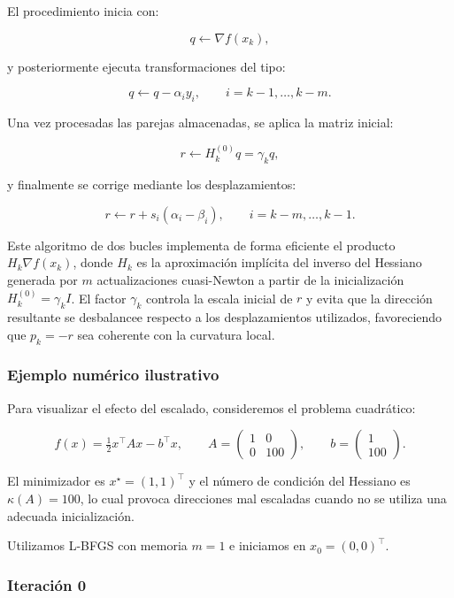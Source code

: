\documentclass[
  spanish,
  us-letterpaper,
  DIV=11,
  numbers=noendperiod]{scrreprt}
\numberwithin{equation}{section}
\begin{document}
El procedimiento inicia con:

\[
q \gets \nabla f(x_k),
\]

y posteriormente ejecuta transformaciones del tipo:

\[
q \gets q - \alpha_i y_i,
\qquad i = k-1,\dots,k-m.
\]

Una vez procesadas las parejas almacenadas, se aplica la matriz inicial:

\[
r \gets H_k^{(0)} q = \gamma_k q,
\]

y finalmente se corrige mediante los desplazamientos:

\[
r \gets r + s_i(\alpha_i - \beta_i),
\qquad i = k-m,\dots,k-1.
\]

Este algoritmo de dos bucles implementa de forma eficiente el producto
\(H_k \nabla f(x_k)\), donde \(H_k\) es la aproximación implícita del
inverso del Hessiano generada por \(m\) actualizaciones cuasi-Newton a
partir de la inicialización \(H_k^{(0)} = \gamma_k I\). El factor
\(\gamma_k\) controla la escala inicial de \(r\) y evita que la
dirección resultante se desbalancee respecto a los desplazamientos
utilizados, favoreciendo que \(p_k = -r\) sea coherente con la curvatura
local.

\subsubsection{Ejemplo numérico
ilustrativo}\label{ejemplo-numuxe9rico-ilustrativo-1}

Para visualizar el efecto del escalado, consideremos el problema
cuadrático:

\[
f(x) = \tfrac{1}{2} x^\top A x - b^\top x,
\qquad
A=
\begin{pmatrix}
1 & 0\\
0 & 100
\end{pmatrix},
\qquad
b=
\begin{pmatrix}
1\\
100
\end{pmatrix}.
\]

El minimizador es \(x^\star = (1,1)^\top\) y el número de condición del
Hessiano es \(\kappa(A) = 100\), lo cual provoca direcciones mal
escaladas cuando no se utiliza una adecuada inicialización.

Utilizamos L-BFGS con memoria \(m=1\) e iniciamos en
\(x_0 = (0,0)^\top\).

\subsubsection{Iteración 0}\label{iteraciuxf3n-0}
\end{document}
